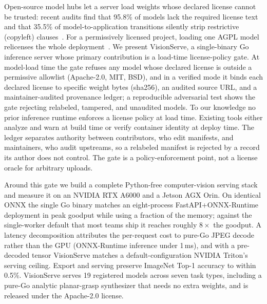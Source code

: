Open-source model hubs let a server load weights whose declared license cannot be trusted:
recent audits find that 95.8\% of models lack the required license text and that 35.5\% of
model-to-application transitions silently strip restrictive (copyleft)
clauses~\cite{jewitt2026permissivewashing,jewitt2025licensedrift}. For a permissively licensed
project, loading one AGPL model relicenses the whole
deployment~\cite{ultralytics2023yolo,agpllicense}. We present VisionServe, a single-binary Go
inference server whose primary contribution is a load-time license-policy gate. At model-load
time the gate refuses any model whose declared license is outside a permissive allowlist
(Apache-2.0, MIT, BSD), and in a verified mode it binds each declared license to specific weight
bytes (sha256), an audited source URL, and a maintainer-audited provenance ledger; a reproducible
adversarial test shows the gate rejecting relabeled, tampered, and unaudited models. To our
knowledge no prior inference runtime enforces a license policy at load time. Existing tools either
analyze and warn at build time or verify container identity at deploy time. The ledger separates
authority between contributors, who edit manifests, and maintainers, who audit upstreams, so a
relabeled manifest is rejected by a record its author does not control. The gate is a
policy-enforcement point, not a license oracle for arbitrary uploads.

Around this gate we build a complete Python-free computer-vision serving stack and measure it on
an NVIDIA RTX A6000 and a Jetson AGX Orin. On identical ONNX the single Go binary matches an
eight-process FastAPI+ONNX-Runtime deployment in peak goodput while using a fraction of the
memory; against the single-worker default that most teams ship it reaches roughly $8\times$ the
goodput. A latency decomposition attributes the per-request cost to pure-Go JPEG decode rather
than the GPU (ONNX-Runtime inference under 1\,ms), and with a pre-decoded tensor VisionServe
matches a default-configuration NVIDIA Triton's serving ceiling. Export and serving preserve
ImageNet Top-1 accuracy to within 0.5\%. VisionServe serves 19 registered models across seven task
types, including a pure-Go analytic planar-grasp synthesizer that needs no extra weights, and is
released under the Apache-2.0 license.
